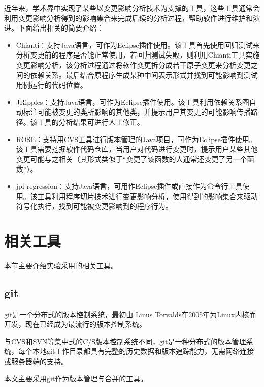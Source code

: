 近年来，学术界中实现了某些以变更影响分析技术为支撑的工具，这些工具通常会利用变更影响分析得到的影响集合来完成后续的分析过程，帮助软件进行维护和演进。下面给出相关的简要介绍：
\begin{itemize}
	\item Chianti：支持Java语言，可作为Eclipse插件使用\cite{ren2004chianti}。该工具首先使用回归测试来分析变更前的程序是否能正常使用，若回归测试失败，则利用Chianti工具实施变更影响分析，该分析过程通过将软件变更拆分成若干原子变更来分析变更之间的依赖关系。最后结合原程序生成某种中间表示形式并找到可能影响到测试用例运行的代码位置。
	
	\item JRipples：支持Java语言，可作为Eclipse插件使用\cite{buckner2005jripples,rajlich2004incremental}。该工具利用依赖关系图自动标注可能被变更的类所影响的其他类，并提示用户其变更的可能影响传播路径。该工具的分析结果可进行人工修正。
	
	\item ROSE：支持用CVS工具进行版本管理的Java项目，可作为Eclipse插件使用\cite{zimmermann2005mining}。该工具需要挖掘软件代码仓库，当用户对代码进行变更时，提示用户某些其他变更可能与之相关（其形式类似于“变更了该函数的人通常还变更了另一个函数”）。
	
	\item jpf-regression：支持Java语言，可用作Eclipse插件或直接作为命令行工具使用\cite{person2011directed}。该工具利用程序切片技术进行变更影响分析，使用得到的影响集合来驱动符号化执行，找到可能被变更影响到的程序行为。
\end{itemize}



\section{相关工具}
\label{relate_tool}
	本节主要介绍实验采用的相关工具。
	

	\subsection{git}		

git是一个分布式的版本控制系统，最初由 Linus Torvalds在2005年为Linux内核而开发，现在已经成为最流行的版本控制系统。

与CVS和SVN等集中式的C/S版本控制系统不同，git是一种分布式的版本管理系统，每个本地git工作目录都具有完整的历史数据和版本追踪能力，无需网络连接或服务器端的支持。
      
本文主要采用git作为版本管理与合并的工具。

